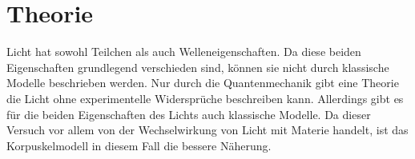 \section{Theorie}
\label{sec:Theorie}

Licht hat sowohl Teilchen als auch Welleneigenschaften.
Da diese beiden Eigenschaften grundlegend verschieden sind, können sie nicht durch klassische Modelle beschrieben werden.
Nur durch die Quantenmechanik gibt eine Theorie die Licht ohne experimentelle Widersprüche beschreiben kann.
Allerdings gibt es für die beiden Eigenschaften des Lichts auch klassische Modelle.
Da dieser Versuch vor allem von der Wechselwirkung von Licht mit Materie handelt, ist das Korpuskelmodell in diesem Fall die bessere Näherung.